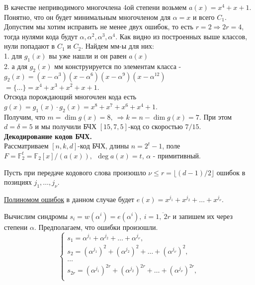 В качестве неприводимого многочлена 4ой степени возьмем
$a(x) = x^4 + x + 1$. Понятно, что он будет минимальным многочленом для
$\alpha = x$ и всего $C_1$.\\

Допустим мы хотим исправить не менее двух ошибок, то есть
$r = 2 \Rightarrow 2r = 4$, тогда нулями кода будут
$\alpha, \alpha^2, \alpha^3, \alpha^4$. Как видно из построенных выше классов,
нули попадают в $C_1$ и $C_2$. Найдем мм-ы для них:\\
1. для $g_1(x)$ вы уже нашли и он равен $a(x)$\\
2. а для $g_2(x)$ мм конструируется по элементам класса - \\
$
  g_2(x) = (x - \alpha^3)(x - \alpha^6)(x - \alpha^9)(x - \alpha^{12})
$$
  = \{\ldots\} = x^4 + x^3 + x^2 + x + 1
$.\\

Отсюда порождающий многочлен кода есть\\
$g(x) = g_1(x) \cdot g_2(x) = x^8 + x^7 + x^6 + x^4 + 1$.\\

Получим, что $m = \dim g(x) = 8,~\Rightarrow k = n - \dim g(x) = 7$. При этом\
$d = \delta = 5$ и мы получили БЧХ $[15,7,5]$-код со скоростью $7 / 15$.\\

\textbf{Декодирование кодов БЧХ.}\\
Рассматриваем $[n,k,d]$-код БЧХ, длины $n=2^t - 1$, поле
$F = \mathbb{F}_2^t = \mathbb{F}_2[x]/(a(x)),~~\deg a(x) = t$, $\alpha$ - примитивный.

Пусть при передаче кодового слова произошло
$\nu \le r = \lfloor (d - 1)/2 \rfloor$ ошибок в позициях
$j_1, \ldots, j_\nu$.

\underline{Полиномом ошибок} в данном случае будет
$e(x) = x^{j_1} + x^{j_2} + \dots + x^{j_\nu}$.

Вычислим синдромы $s_i = w(\alpha^i) = e(\alpha^i),~ i=\overline{1,~2r}$ и
запишем их через степени $\alpha$. Предполагаем, что ошибки произошли.
\begin{equation*}\begin{cases}
  s_1 = \alpha^{j_1} + \alpha^{j_2} + \ldots + \alpha^{j_\nu},\\
  s_2 = (\alpha^{j_1})^{2} + (\alpha^{j_2})^{2} + \ldots + (\alpha^{j_\nu})^{2},\\
  \dots\\
  s_{2r} = (\alpha^{j_1})^{2r} + (\alpha^{j_2})^{2r} + \ldots + (\alpha^{j_\nu})^{2r},\\
\end{cases}\end{equation*}

